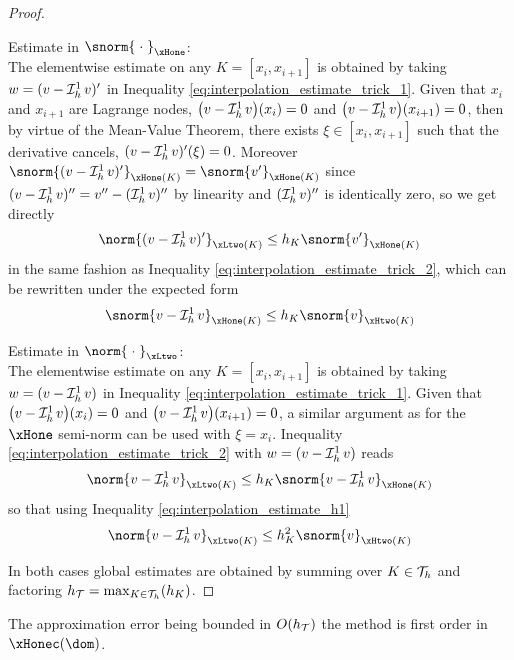 \begin{proof}
\medskip
\begin{tmaproofitems}
\item Estimate in $\snorm{\;\cdot\;}_{\xHone}$:\\
The elementwise estimate on any $K = [x_{i}, x_{i+1}]$ is obtained by taking $w = (v - \mathop{\mathcal{I}_{h}^{1}}v)'$ in Inequality \eqref{eq:interpolation_estimate_trick_1}.
Given that $x_i$ and $x_{i+1}$ are Lagrange nodes, $\bigl(v-\mathop{\mathcal{I}_{h}^{1}}v\bigr)(x_i) = 0$ and $\bigl(v-\mathop{\mathcal{I}_{h}^{1}}v\bigr)(x_{i+1}) = 0$, then by virtue of the Mean-Value Theorem, there exists $\xi\in[x_{i}, x_{i+1}]$ such that the derivative cancels, $(v-\mathop{\mathcal{I}_{h}^{1}}v)'(\xi) = 0$.
Moreover $\snorm{(v-\Lgrh{1}v)'}_{\xHone(K)} = \snorm{v'}_{\xHone(K)}$ since $(v-\mathop{\mathcal{I}_{h}^{1}}v)'' = v'' - (\mathop{\mathcal{I}_{h}^{1}}v)''$ by linearity and $(\mathop{\mathcal{I}_{h}^{1}}v)''$ is identically zero, so we get directly
\begin{equation*}
\norm{(v-\Lgrh{1}v)'}_{\xLtwo(K)} \leq h_K\snorm{v'}_{\xHone(K)}
\end{equation*}
in the same fashion as Inequality \eqref{eq:interpolation_estimate_trick_2}, which can be rewritten under the expected form
\begin{equation}\label{eq:interpolation_estimate_h1}
\snorm{v-\Lgrh{1}v}_{\xHone(K)} \leq h_K\snorm{v}_{\xHtwo(K)}
\end{equation}
\item Estimate in $\norm{\;\cdot\;}_{\xLtwo}$:\\
The elementwise estimate on any $K = [x_{i}, x_{i+1}]$ is obtained by taking $w = (v - \mathop{\mathcal{I}_{h}^{1}}v)$ in Inequality \eqref{eq:interpolation_estimate_trick_1}.
Given that $\bigl(v-\mathop{\mathcal{I}_{h}^{1}}v\bigr)(x_i) = 0$ and $\bigl(v-\mathop{\mathcal{I}_{h}^{1}}v\bigr)(x_{i+1}) = 0$, a similar argument as for the $\xHone$ semi-norm can be used with $\xi = x_i$.
Inequality \eqref{eq:interpolation_estimate_trick_2} with $w = (v - \mathop{\mathcal{I}_{h}^{1}}v)$ reads
\begin{equation*}
\norm{v-\Lgrh{1}v}_{\xLtwo(K)} \leq h_K\snorm{v-\Lgrh{1}v}_{\xHone(K)}
\end{equation*}
so that using Inequality \eqref{eq:interpolation_estimate_h1}
\begin{equation*}
\norm{v-\Lgrh{1}v}_{\xLtwo(K)} \leq h^2_K\snorm{v}_{\xHtwo(K)}
\end{equation*}
\end{tmaproofitems}
In both cases global estimates are obtained by summing over $K\in{\mathcal T}_h$ and factoring $h_{\mathcal T} = \max_{K\in{\mathcal T}_h}(h_K)$.
\end{proof}

The approximation error being bounded in $O(h_{\mathcal T})$ the method is first order in $\xHonec(\dom)$.

